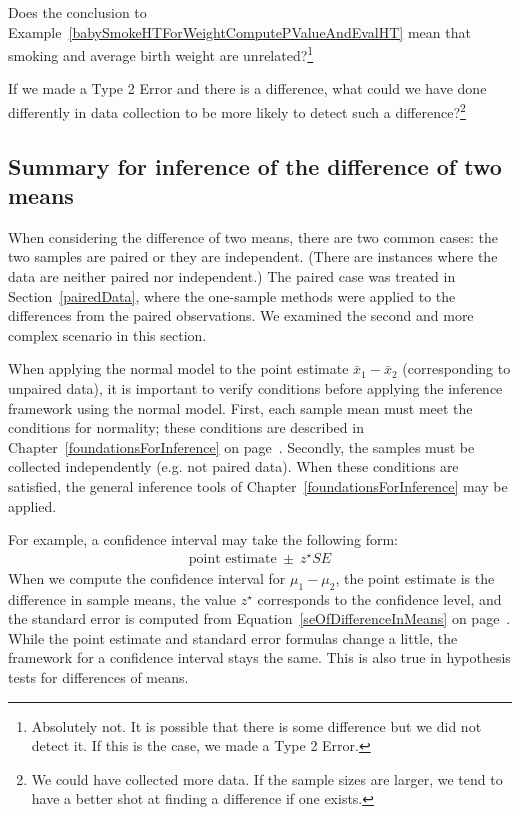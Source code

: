 \begin{exercise}
Does the conclusion to Example~\ref{babySmokeHTForWeightComputePValueAndEvalHT} mean that smoking and average birth weight are unrelated?\footnote{Absolutely not. It is possible that there is some difference but we did not detect it. If this is the case, we made a Type 2 Error.}
\end{exercise}

\begin{exercise} \label{babySmokeHTIDingHowToDetectDifferences}
If we made a Type 2 Error and there is a difference, what could we have done differently in data collection to be more likely to detect such a difference?\footnote{We could have collected more data. If the sample sizes are larger, we tend to have a better shot at finding a difference if one exists.}


\end{exercise}

\subsection{Summary for inference of the difference of two means}

When considering the difference of two means, there are two common cases: the two samples are paired or they are independent. (There are instances where the data are neither paired nor independent.) The paired case was treated in Section~\ref{pairedData}, where the one-sample methods were applied to the differences from the paired observations. We examined the second and more complex scenario in this section.

When applying the normal model to the point estimate $\bar{x}_1 - \bar{x}_2$ (corresponding to unpaired data), it is important to verify conditions before applying the inference framework using the normal model. First, each sample mean must meet the conditions for normality; these conditions are described in Chapter~\ref{foundationsForInference} on page~\pageref{terBoxOfCondForXBarBeingNearlyNormalAndSEBeingAccurate}. Secondly, the samples must be collected independently (e.g. not paired data). When these conditions are satisfied, the general inference tools of Chapter~\ref{foundationsForInference} may be applied.

For example, a confidence interval may take the following form:
\begin{eqnarray*}
\text{point estimate}\ \pm\ z^{\star} SE
\end{eqnarray*}
When we compute the confidence interval for $\mu_1 - \mu_2$, the point estimate is the difference in sample means, the value $z^{\star}$ corresponds to the confidence level, and the standard error is computed from Equation~\eqref{seOfDifferenceInMeans} on page~\pageref{seOfDifferenceInMeans}. While the point estimate and standard error formulas change a little, the framework for a confidence interval stays the same. This is also true in hypothesis tests for differences of means.

